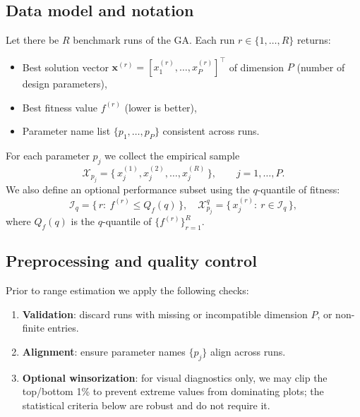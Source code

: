 \documentclass[12pt,a4paper]{article}
\begin{document}
\subsection{Data model and notation}
Let there be $R$ benchmark runs of the GA. Each run $r\in\{1,\dots,R\}$ returns:
\begin{itemize}
    \item Best solution vector $\mathbf{x}^{(r)} = [x^{(r)}_1,\dots, x^{(r)}_P]^\top$ of dimension $P$ (number of design parameters),
    \item Best fitness value $f^{(r)}$ (lower is better),
    \item Parameter name list $\{p_1,\dots,p_P\}$ consistent across runs.
\end{itemize}
For each parameter $p_j$ we collect the empirical sample
\begin{equation}
    \mathcal{X}_{p_j} = \{\, x^{(1)}_j, x^{(2)}_j, \dots, x^{(R)}_j \,\},\qquad j=1,\dots,P.
\end{equation}
We also define an optional performance subset using the $q$-quantile of fitness:
\begin{equation}
    \mathcal{I}_{q} = \{\, r:\ f^{(r)} \leq Q_f(q) \,\},\quad \mathcal{X}^{q}_{p_j}=\{\, x^{(r)}_j:\ r\in \mathcal{I}_{q}\,\},
\end{equation}
where $Q_f(q)$ is the $q$-quantile of $\{f^{(r)}\}_{r=1}^R$.

\subsection{Preprocessing and quality control}
Prior to range estimation we apply the following checks:
\begin{enumerate}[label=\textbf{P\arabic*}]
    \item \textbf{Validation}: discard runs with missing or incompatible dimension $P$, or non-finite entries.
    \item \textbf{Alignment}: ensure parameter names $\{p_j\}$ align across runs.
    \item \textbf{Optional winsorization}: for visual diagnostics only, we may clip the top/bottom 1\% to prevent extreme values from dominating plots; the statistical criteria below are robust and do not require it.
\end{enumerate}
\end{document}
